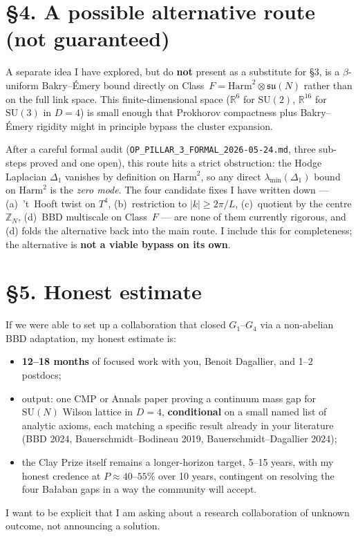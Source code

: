\documentclass[11pt,a4paper]{article}
\newcommand{\R}{\mathbb{R}}
\newcommand{\Z}{\mathbb{Z}}
\newcommand{\Harm}{\mathrm{Harm}}
\newcommand{\su}[1]{\mathfrak{su}(#1)}
\newcommand{\SU}[1]{\mathrm{SU}(#1)}
\begin{document}
\section*{§4. A possible alternative route (not guaranteed)}

A separate idea I have explored, but do \textbf{not} present as a substitute for §3, is a $\beta$-uniform Bakry--Émery bound directly on Class~$F = \Harm^2 \otimes \su{N}$ rather than on the full link space. This finite-dimensional space ($\R^6$ for $\SU{2}$, $\R^{16}$ for $\SU{3}$ in $D=4$) is small enough that Prokhorov compactness plus Bakry--Émery rigidity might in principle bypass the cluster expansion.

After a careful formal audit (\texttt{OP\_PILLAR\_3\_FORMAL\_2026-05-24.md}, three sub-steps proved and one open), this route hits a strict obstruction: the Hodge Laplacian $\Delta_1$ vanishes by definition on $\Harm^2$, so any direct $\lambda_{\min}(\Delta_1)$ bound on $\Harm^2$ is the \emph{zero mode}. The four candidate fixes I have written down --- (a)~'t~Hooft twist on $T^4$, (b)~restriction to $|k|\ge 2\pi/L$, (c)~quotient by the centre $\Z_N$, (d)~BBD multiscale on Class~$F$ --- are none of them currently rigorous, and (d) folds the alternative back into the main route. I include this for completeness; the alternative is \textbf{not a viable bypass on its own}.

\section*{§5. Honest estimate}

If we were able to set up a collaboration that closed $G_1$--$G_4$ via a non-abelian BBD adaptation, my honest estimate is:
\begin{itemize}
  \item \textbf{12--18 months} of focused work with you, Benoit Dagallier, and 1--2 postdocs;
  \item output: one CMP or Annals paper proving a continuum mass gap for $\SU{N}$ Wilson lattice in $D=4$, \textbf{conditional} on a small named list of analytic axioms, each matching a specific result already in your literature (BBD 2024, Bauerschmidt--Bodineau 2019, Bauerschmidt--Dagallier 2024);
  \item the Clay Prize itself remains a longer-horizon target, 5--15 years, with my honest credence at $P \approx 40$--$55\%$ over 10 years, contingent on resolving the four Bałaban gaps in a way the community will accept.
\end{itemize}
I want to be explicit that I am asking about a research collaboration of unknown outcome, not announcing a solution.
\end{document}
